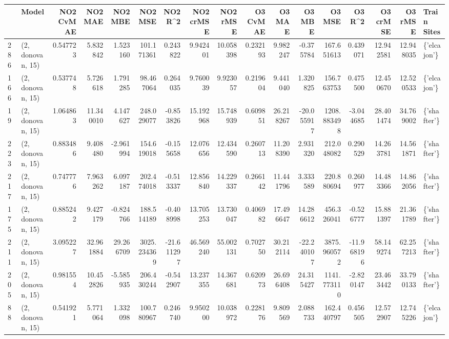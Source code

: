 \begin{tabular}{llrrrrrrrrrrrrrrl}
\toprule
{} &             Model &  NO2 CvMAE &    NO2 MAE &    NO2 MBE &      NO2 MSE &    NO2 R\textasciicircum 2 &  NO2 crMSE &   NO2 rMSE &  O3 CvMAE &     O3 MAE &     O3 MBE &       O3 MSE &     O3 R\textasciicircum 2 &   O3 crMSE &    O3 rMSE &  Train Sites \\
\midrule
286 &  (2, donovan, 15) &   0.547723 &   5.832842 &   1.523160 &   101.171361 &   0.243822 &   9.942401 &  10.058398 &  0.232193 &   9.982247 &  -0.375784 &   167.651613 &   0.439071 &  12.942581 &  12.948035 &  \{'elcajon'\} \\
166 &  (2, donovan, 15) &   0.537748 &   5.726618 &   1.791285 &    98.467064 &   0.264035 &   9.760039 &   9.923057 &  0.219604 &   9.441040 &   1.320825 &   156.763753 &   0.475500 &  12.450670 &  12.520533 &  \{'elcajon'\} \\
19  &  (2, donovan, 15) &   1.064863 &  11.340010 &   4.147627 &   248.029077 &  -0.853826 &  15.192968 &  15.748939 &  0.609851 &  26.218267 & -20.055917 &  1208.883498 &  -3.044685 &  28.401474 &  34.769002 &  \{'shafter'\} \\
223 &  (2, donovan, 15) &   0.883486 &   9.408480 &  -2.961994 &   154.619018 &  -0.155658 &  12.076656 &  12.434590 &  0.260713 &  11.208390 &   2.931320 &   212.048082 &   0.290529 &  14.263781 &  14.561871 &  \{'shafter'\} \\
217 &  (2, donovan, 15) &   0.747776 &   7.963262 &   6.097187 &   202.474018 &  -0.513337 &  12.856840 &  14.229337 &  0.266142 &  11.441796 &   3.333589 &   220.880694 &   0.260977 &  14.483366 &  14.862056 &  \{'shafter'\} \\
175 &  (2, donovan, 15) &   0.885242 &   9.427179 &  -0.824766 &   188.514189 &  -0.408998 &  13.705253 &  13.730047 &  0.406982 &  17.496647 &  14.286612 &   456.326041 &  -0.526777 &  15.881397 &  21.361789 &  \{'shafter'\} \\
211 &  (2, donovan, 15) &   3.095227 &  32.961884 &  29.266709 &  3025.234369 & -21.611297 &  46.569240 &  55.002131 &  0.702750 &  30.212114 & -22.240107 &  3875.960572 & -11.968196 &  58.149274 &  62.257213 &  \{'shafter'\} \\
205 &  (2, donovan, 15) &   0.981554 &  10.452826 &  -5.585935 &   206.430244 &  -0.542907 &  13.237355 &  14.367681 &  0.620973 &  26.696408 &  24.315427 &  1141.773110 &  -2.820147 &  23.463442 &  33.790133 &  \{'shafter'\} \\
88  &  (2, donovan, 15) &   0.541921 &   5.771064 &   1.332098 &   100.780967 &   0.246740 &   9.950200 &  10.038972 &  0.228176 &   9.809569 &   2.088733 &   162.440797 &   0.456505 &  12.572907 &  12.745226 &  \{'elcajon'\} \\

\end{tabular}
